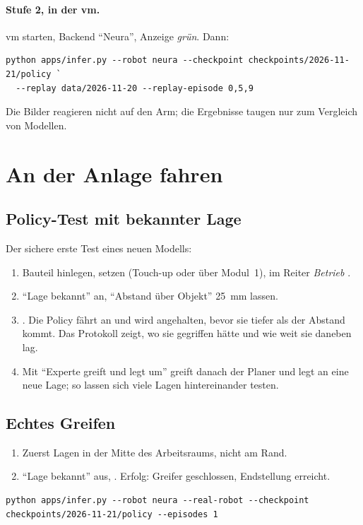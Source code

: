 \paragraph{Stufe 2, in der \acs{vm}.} \acs{vm} starten, Backend \enquote{Neura}, Anzeige
\emph{grün}. Dann:
\begin{lstlisting}[style=ps]
python apps/infer.py --robot neura --checkpoint checkpoints/2026-11-21/policy `
  --replay data/2026-11-20 --replay-episode 0,5,9
\end{lstlisting}
Die Bilder reagieren nicht auf den Arm; die Ergebnisse taugen nur zum Vergleich von Modellen.

\section{An der Anlage fahren}
\label{sec:fahren}

\subsection{Policy-Test mit bekannter Lage}
\label{sec:policy-test}

Der sichere erste Test eines neuen Modells:
\begin{enumerate}
  \item Bauteil hinlegen,  setzen (Touch-up oder über Modul~1), im Reiter
    \emph{Betrieb} .
  \item \enquote{Lage bekannt} an, \enquote{Abstand über Objekt} \SI{25}{\milli\metre} lassen.
  \item {}. Die Policy fährt an und wird angehalten, bevor sie tiefer als
    der Abstand kommt. Das Protokoll zeigt, wo sie gegriffen hätte und wie weit sie daneben lag.
  \item Mit \enquote{Experte greift und legt um} greift danach der Planer und legt an eine neue
    Lage; so lassen sich viele Lagen hintereinander testen.
\end{enumerate}

\subsection{Echtes Greifen}
\begin{enumerate}
  \item Zuerst Lagen in der Mitte des Arbeitsraums, nicht am Rand.
  \item \enquote{Lage bekannt} aus, . Erfolg: Greifer geschlossen,
    Endstellung erreicht.
\end{enumerate}
\begin{lstlisting}[style=ps]
python apps/infer.py --robot neura --real-robot --checkpoint checkpoints/2026-11-21/policy --episodes 1
\end{lstlisting}

